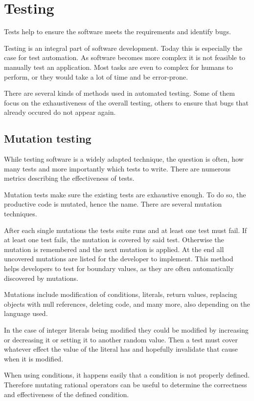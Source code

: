 \section{Testing}

Tests help to ensure the software meets the requirements and identify bugs.

Testing is an integral part of software development. Today this is especially
the case for test automation. As software becomes more complex it is not
feasible to manually test an application. Most tasks are even to complex for
humans to perform, or they would take a lot of time and be error-prone.

There are several kinds of methods used in automated testing. Some of them
focus on the exhaustiveness of the overall testing, others to ensure that bugs
that already occured do not appear again.

\subsection{Mutation testing}

While testing software is a widely adapted technique, the question is often,
how many tests and more importantly which tests to write. There are numerous
metrics describing the effectiveness of tests.

Mutation tests make sure the existing tests are exhaustive enough. To do so,
the productive code is mutated, hence the name. There are several mutation
techniques.

After each single mutations the tests suite runs and at least one test must
fail. If at least one test fails, the mutation is covered by said test.
Otherwise the mutation is remembered and the next mutation is applied. At the
end all uncovered mutations are listed for the developer to implement. This
method helps developers to test for boundary values, as they are often
automatically discovered by mutations.

Mutations include modification of conditions, literals, return values,
replacing objects with null references, deleting code, and many more, also
depending on the language used.

In the case of integer literals being modified they could be modified by
increasing or decreasing it or setting it to another random value. Then a test
must cover whatever effect the value of the literal has and hopefully
invalidate that cause when it is modified.

When using conditions, it happens easily that a condition is not properly
defined. Therefore mutating rational operators can be useful to determine the
correctness and effectiveness of the defined condition.

